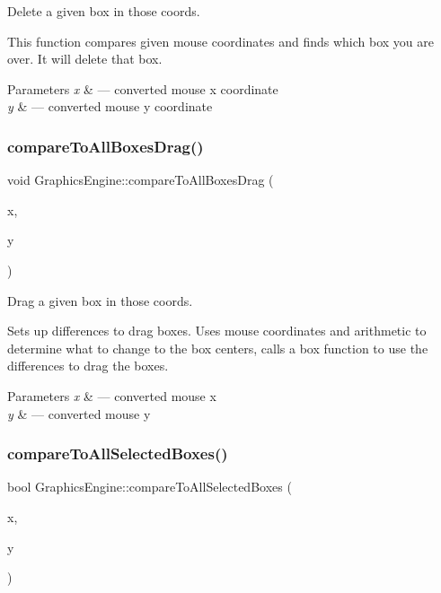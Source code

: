 Delete a given box in those coords. 

This function compares given mouse coordinates and finds which box you are over. It will delete that box.


\begin{DoxyParams}{Parameters}
{\em x} & --- converted mouse x coordinate \\
\hline
{\em y} & --- converted mouse y coordinate \\
\hline
\end{DoxyParams}
\mbox{\label{class_graphics_engine_a2cccf1122d2083c4064dedcba89aa994}} 
\subsubsection{\texorpdfstring{compare\+To\+All\+Boxes\+Drag()}{compareToAllBoxesDrag()}}
{\footnotesize\ttfamily void Graphics\+Engine\+::compare\+To\+All\+Boxes\+Drag (\begin{DoxyParamCaption}\item[{G\+Lfloat}]{x,  }\item[{G\+Lfloat}]{y }\end{DoxyParamCaption})}



Drag a given box in those coords. 

Sets up differences to drag boxes. Uses mouse coordinates and arithmetic to determine what to change to the box centers, calls a box function to use the differences to drag the boxes.


\begin{DoxyParams}{Parameters}
{\em x} & --- converted mouse x \\
\hline
{\em y} & --- converted mouse y \\
\hline
\end{DoxyParams}
\mbox{\label{class_graphics_engine_a683606dd2698ae7a7fbcc892ff4a54ba}} 
\subsubsection{\texorpdfstring{compare\+To\+All\+Selected\+Boxes()}{compareToAllSelectedBoxes()}}
{\footnotesize\ttfamily bool Graphics\+Engine\+::compare\+To\+All\+Selected\+Boxes (\begin{DoxyParamCaption}\item[{G\+Lfloat}]{x,  }\item[{G\+Lfloat}]{y }\end{DoxyParamCaption})}



